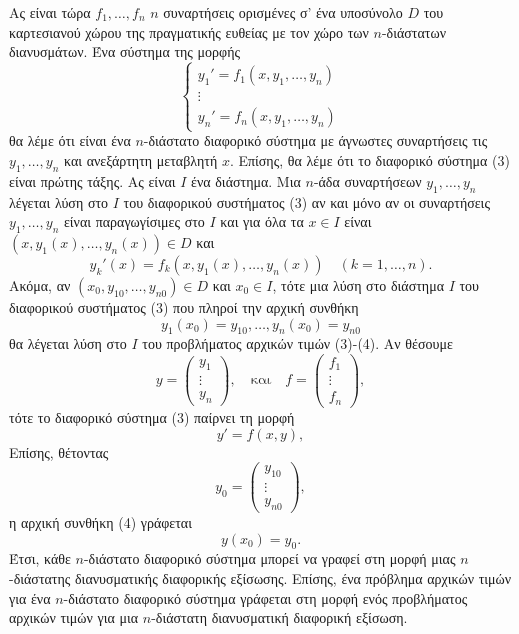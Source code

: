 \documentclass[a4paper,twoside,11pt]{book}
\begin{document}
Ας είναι τώρα $f_1, \dots, f_n$ $n$ συναρτήσεις ορισμένες σ' ένα υποσύνολο $D$ του καρτεσιανού χώρου της πραγματικής ευθείας με τον χώρο των $n$-διάστατων διανυσμάτων. Ένα σύστημα της μορφής
\begin{equation}
    \begin{cases}
        y_1' = f_1(x,y_1, \dots, y_n) \\
        \vdots \\
        y_n' = f_n(x,y_1, \dots, y_n)
    \end{cases}
\end{equation}
θα λέμε ότι είναι ένα $n$-διάστατο διαφορικό σύστημα με άγνωστες συναρτήσεις τις $y_1, \dots, y_n$ και ανεξάρτητη μεταβλητή $x$. Επίσης, θα λέμε ότι το διαφορικό σύστημα (3) είναι πρώτης τάξης. Ας είναι $I$ ένα διάστημα. Μια $n$-άδα συναρτήσεων $y_1, \dots, y_n$ λέγεται λύση στο $I$ του διαφορικού συστήματος (3) αν και μόνο αν οι συναρτήσεις $y_1, \dots, y_n$ είναι παραγωγίσιμες στο $I$ και για όλα τα $x \in I$ είναι $(x,y_1(x), \dots, y_n(x)) \in D$ και
\[
    y_k'(x) = f_k(x,y_1(x), \dots, y_n(x)) \quad (k=1,\dots,n).
\]
Ακόμα, αν $(x_0,y_{10}, \dots, y_{n0}) \in D$ και $x_0 \in I$, τότε μια λύση στο διάστημα $I$ του διαφορικού συστήματος (3) που πληροί την αρχική συνθήκη
\begin{equation}
    y_1(x_0)=y_{10}, \dots, y_n(x_0)=y_{n0}
\end{equation}
θα λέγεται λύση στο $I$ του προβλήματος αρχικών τιμών (3)-(4). Αν θέσουμε
\[
    y = \begin{pmatrix} y_1 \\ \vdots \\ y_n \end{pmatrix}, \quad \text{και} \quad f = \begin{pmatrix} f_1 \\ \vdots \\ f_n \end{pmatrix},
\]
τότε το διαφορικό σύστημα (3) παίρνει τη μορφή
\begin{equation*} \label{eq:3prime}
    y' = f(x,y), \tag{3'}
\end{equation*}
Επίσης, θέτοντας
\[
    y_0 = \begin{pmatrix} y_{10} \\ \vdots \\ y_{n0} \end{pmatrix},
\]
η αρχική συνθήκη (4) γράφεται
\begin{equation*} \label{eq:4prime}
    y(x_0) = y_0. \tag{4'}
\end{equation*}
Έτσι, κάθε $n$-διάστατο διαφορικό σύστημα μπορεί να γραφεί στη μορφή μιας $n$-διάστατης διανυσματικής διαφορικής εξίσωσης. Επίσης, ένα πρόβλημα αρχικών τιμών για ένα $n$-διάστατο διαφορικό σύστημα γράφεται στη μορφή ενός προβλήματος αρχικών τιμών για μια $n$-διάστατη διανυσματική διαφορική εξίσωση.
\end{document}
